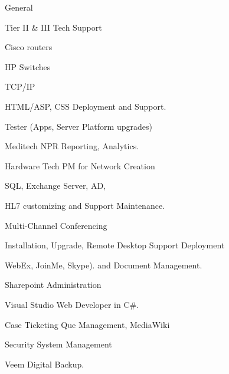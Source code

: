 \begin{cventries}
  \cventry
    {General}
    {
      \begin{cvitems}
        \item Tier II \& III Tech Support 
        \item Cisco routers
        \item HP Switches
        \item TCP/IP
        \item HTML/ASP, CSS Deployment and Support.
        \item Tester (Apps, Server Platform upgrades) 
        \item Meditech NPR Reporting, Analytics.
        \item Hardware Tech PM for Network Creation 
        \item SQL, Exchange Server, AD, 
        \item HL7 customizing and Support Maintenance.
        \item Multi-Channel Conferencing
        \item Installation, Upgrade, Remote Desktop Support Deployment
        \item WebEx, JoinMe, Skype). and Document Management.
        \item Sharepoint Administration
        \item Visual Studio Web Developer in C\#.
        \item Case Ticketing Que Management, MediaWiki
        \item Security System Management
        \item Veem Digital Backup.
      \end{cvitems}
    }
\end{cventries}
